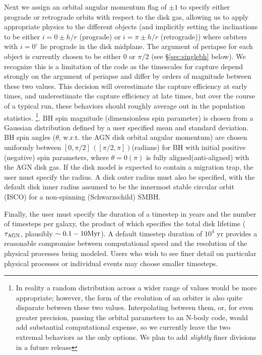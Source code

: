 Next we assign an orbital angular momentum flag of $\pm 1$ to specify either prograde or retrograde orbits with respect to the disk gas, allowing us to apply appropriate physics to the different objects (and implicitly setting the inclinations to be either $i=0\pm h/r$ (prograde) or $i=\pi \pm h/r$ (retrograde)) where orbiters with $i=0^{\circ}$ lie prograde in the disk midplane.
The argument of periapse for each object is currently chosen to be either $0$ or $\pi/2$ (see \S\ref{sec:singlebh} below).
We recognize this is a limitation of the code as the timescales for capture depend strongly on the argument of periapse and differ by orders of magnitude between these two values.
This decision will overestimate the capture efficiency at early times, and underestimate the capture efficiency at late times, but over the course of a typical run, these behaviors should roughly average out in the population statistics.
\footnote{In reality a random distribution across a wider range of values would be more appropriate; however, the form of the evolution of an orbiter is also quite disparate between these two values.
Interpolating between them, or, for even greater precision, passing the orbital parameters to an N-body code, would add substantial computational expense, so we currently leave the two extremal behaviors as the only options.
We plan to add \textit{slightly} finer divisions in a future release}.
BH spin magnitude (dimensionless spin parameter) is chosen from a Gaussian distribution defined by a user specified mean and standard deviation.
BH spin angles ($\theta$, w.r.t. the AGN disk orbital angular momentum) are chosen uniformly between $[0,\pi/2]\,([\pi/2,\pi])$(radians) for BH with initial positive (negative) spin parameters, where $\theta=0(\pi)$ is fully aligned(anti-aligned) with the AGN disk gas.
If the disk model is expected to contain a migration trap, the user must specify the radius.
A disk outer radius must also be specified, with the default disk inner radius assumed to be the innermost stable circular orbit (ISCO) for a non-spinning (Schwarzschild) SMBH. 

Finally, the user must specify the duration of a timestep in years and the number of timesteps per galaxy, the product of which specifies the total disk lifetime ($\tau_{\rm AGN}$, plausibly $\sim 0.1-10{\rm Myr}$).
A default timestep duration of $10^{4}$ yr provides a reasonable compromise between computational speed and the resolution of the physical processes being modeled.
Users who wish to see finer detail on particular physical processes or individual events may choose smaller timesteps. 

